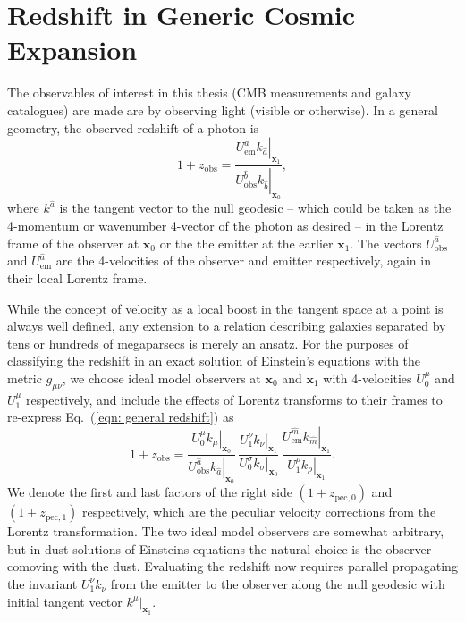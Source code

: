 \documentclass[a4paper,12pt]{report}
\renewcommand{\vec}[1]{\ensuremath{\bm{#1}}}
\renewcommand{\eqref}[1]{Eq.~({#1})}
\begin{document}
\section{Redshift in Generic Cosmic Expansion}\label{section: generic redshift}
The observables of interest in this thesis (CMB measurements and galaxy catalogues) are made are by observing light (visible or otherwise). In a general geometry, the observed redshift of a photon is
\begin{equation}\label{eqn: general redshift}
    1+z_\text{obs} = \frac{\left. U^{\hat{a}}_\text{em} k_{\hat{a}}\right| _{\vec{x}_1}}{\left. U^{\hat{b}}_\text{obs} k_{\hat{b}}\right|_{\vec{x}_0}},
\end{equation}
where $k^{\hat{a}}$ is the tangent vector to the null geodesic -- which could be taken as the 4-momentum or wavenumber 4-vector of the photon as desired -- in the Lorentz frame of the observer at $\vec{x}_0$ or the the emitter at the earlier $\vec{x}_1$. The vectors $U_\text{obs}^{\hat{a}}$ and $U_\text{em}^{\hat{a}}$ are the 4-velocities of the observer and emitter respectively, again in their local Lorentz frame.

While the concept of velocity as a local boost in the tangent space at a point is always well defined, any extension to a relation describing galaxies separated by tens or hundreds of megaparsecs is merely an ansatz. For the purposes of classifying the redshift in an exact solution of Einstein's equations with the metric $g_{\mu\nu}$, we choose ideal model observers at $\vec{x}_0$ and $\vec{x}_1$ with 4-velocities $U_0^\mu$ and $U_1^\mu$ respectively, and include the effects of Lorentz transforms to their frames to re-express \eqref{\ref{eqn: general redshift}} as
\begin{equation}\label{eqn: general redshift peculiar split}
    1+z_\text{obs} = \frac{\left. U^\mu_0 k_\mu\right| _{\vec{x}_0}}{\left. U^{\hat{a}}_\text{obs} k_{\hat{a}}\right|_{\vec{x}_0}}\,
    \frac{\left. U^\nu_1 k_\nu\right| _{\vec{x}_1}}{\left. U^\sigma_0 k_\sigma\right|_{\vec{x}_0}}\,
    \frac{\left. U^{\hat{m}}_\text{em} k_{\hat{m}}\right|_{\vec{x}_1}}{\left. U^\rho_1 k_\rho\right|_{\vec{x}_1}}.
\end{equation}
We denote the first and last factors of the right side $(1+z_{\text{pec},0})$ and $(1+z_{\text{pec},1})$ respectively, which are the peculiar velocity corrections from the Lorentz transformation. The two ideal model observers are somewhat arbitrary, but in dust solutions of Einsteins equations the natural choice is the observer comoving with the dust. Evaluating the redshift now requires parallel propagating the invariant $U^\nu_1 k_\nu$ from the emitter to the observer along the null geodesic with initial tangent vector $k^\mu |_{\vec{x}_1}$.
\end{document}
